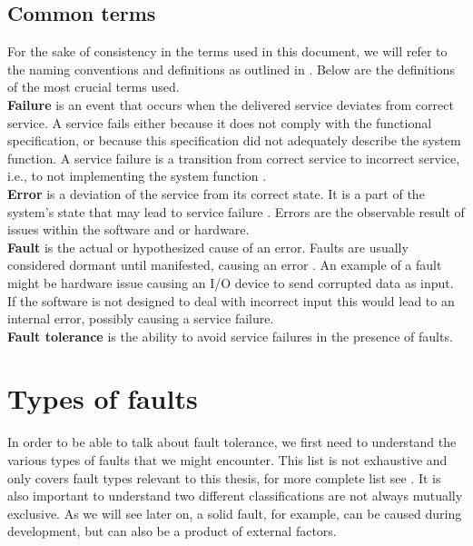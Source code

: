 \documentclass[12pt, letterpaper]{article}
\begin{document}
\subsection{Common terms}

For the sake of consistency in the terms used in this document, we will refer to the naming conventions and definitions as outlined in \cite{1335465}. Below are the definitions of the most crucial terms used. \\

\textbf{Failure} is an event that occurs when the delivered service deviates from correct service. A service fails either because it does not comply with the functional specification, or because this specification did not adequately describe the system function. A service failure is a transition from correct service to incorrect service, i.e., to not implementing the system function \cite{1335465}. \\

\textbf{Error} is a deviation of the service from its correct state. It is a part of the system's state that may lead to service failure \cite{1335465}. Errors are the observable result of issues within the software and or hardware. \\

\textbf{Fault} is the actual or hypothesized cause of an error. Faults are usually considered dormant until manifested, causing an error \cite{1335465}. An example of a fault might be hardware issue causing an I/O device to send corrupted data as input. If the software is not designed to deal with incorrect input this would lead to an internal error, possibly causing a service failure. \\

\textbf{Fault tolerance} is the ability to avoid service failures in the presence of faults. 

\section{Types of faults}

In order to be able to talk about fault tolerance, we first need to understand the various types of faults that we might encounter. This list is not exhaustive and only covers fault types relevant to this thesis, for more complete list see \cite{1335465}. It is also important to understand two different classifications are not always mutually exclusive. As we will see later on, a solid fault, for example, can be caused during development, but can also be a product of external factors.
\end{document}
